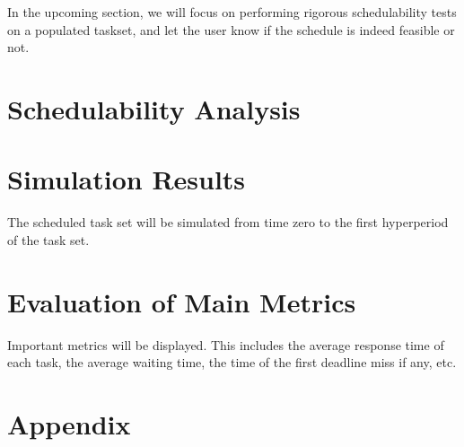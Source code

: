 In the upcoming section, we will focus on performing rigorous schedulability tests on a populated taskset, and let the user know if the schedule is indeed feasible or not.

\section{Schedulability Analysis}

\section{Simulation Results}
The scheduled task set will be simulated from time zero to the first hyperperiod of the task set.
\section{Evaluation of Main Metrics}
Important metrics will be displayed. This includes the average response time of each task, the average waiting time, the time of the first deadline miss if any, etc.




\section*{Appendix}


